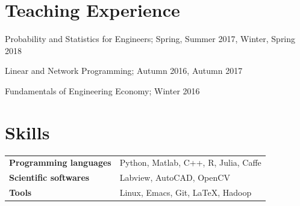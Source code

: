 \documentclass[margin,line,11pt]{resume}
\begin{document}
\begin{resume}
\section{\mysidestyle Teaching Experience}
        \begin{list2}
        \item   Probability and Statistics for Engineers; Spring, Summer 2017, Winter, Spring 2018 
        \item   Linear and Network Programming; Autumn 2016, Autumn 2017
        \item  Fundamentals of Engineering Economy; Winter 2016
        \end{list2}



 \section{\mysidestyle Skills}
\vspace{0.5em}
	\begin{tabular}{ll }
\textbf{Programming languages} &Python, Matlab, C++, R, Julia, Caffe\\
\textbf{Scientific softwares}& Labview,  AutoCAD, OpenCV\\
	\textbf{Tools}& Linux, Emacs, Git, \LaTeX, Hadoop
        \end{tabular}
    	

 	

 	       
\end{resume}   
\end{document}
